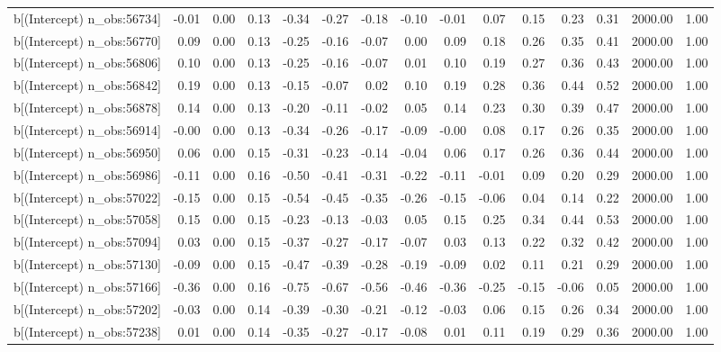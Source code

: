 \begin{table}[ht]
\begin{tabular}{rrrrrrrrrrrrrrr}
  b[(Intercept) n\_obs:56734] & -0.01 & 0.00 & 0.13 & -0.34 & -0.27 & -0.18 & -0.10 & -0.01 & 0.07 & 0.15 & 0.23 & 0.31 & 2000.00 & 1.00 \\ 
  b[(Intercept) n\_obs:56770] & 0.09 & 0.00 & 0.13 & -0.25 & -0.16 & -0.07 & 0.00 & 0.09 & 0.18 & 0.26 & 0.35 & 0.41 & 2000.00 & 1.00 \\ 
  b[(Intercept) n\_obs:56806] & 0.10 & 0.00 & 0.13 & -0.25 & -0.16 & -0.07 & 0.01 & 0.10 & 0.19 & 0.27 & 0.36 & 0.43 & 2000.00 & 1.00 \\ 
  b[(Intercept) n\_obs:56842] & 0.19 & 0.00 & 0.13 & -0.15 & -0.07 & 0.02 & 0.10 & 0.19 & 0.28 & 0.36 & 0.44 & 0.52 & 2000.00 & 1.00 \\ 
  b[(Intercept) n\_obs:56878] & 0.14 & 0.00 & 0.13 & -0.20 & -0.11 & -0.02 & 0.05 & 0.14 & 0.23 & 0.30 & 0.39 & 0.47 & 2000.00 & 1.00 \\ 
  b[(Intercept) n\_obs:56914] & -0.00 & 0.00 & 0.13 & -0.34 & -0.26 & -0.17 & -0.09 & -0.00 & 0.08 & 0.17 & 0.26 & 0.35 & 2000.00 & 1.00 \\ 
  b[(Intercept) n\_obs:56950] & 0.06 & 0.00 & 0.15 & -0.31 & -0.23 & -0.14 & -0.04 & 0.06 & 0.17 & 0.26 & 0.36 & 0.44 & 2000.00 & 1.00 \\ 
  b[(Intercept) n\_obs:56986] & -0.11 & 0.00 & 0.16 & -0.50 & -0.41 & -0.31 & -0.22 & -0.11 & -0.01 & 0.09 & 0.20 & 0.29 & 2000.00 & 1.00 \\ 
  b[(Intercept) n\_obs:57022] & -0.15 & 0.00 & 0.15 & -0.54 & -0.45 & -0.35 & -0.26 & -0.15 & -0.06 & 0.04 & 0.14 & 0.22 & 2000.00 & 1.00 \\ 
  b[(Intercept) n\_obs:57058] & 0.15 & 0.00 & 0.15 & -0.23 & -0.13 & -0.03 & 0.05 & 0.15 & 0.25 & 0.34 & 0.44 & 0.53 & 2000.00 & 1.00 \\ 
  b[(Intercept) n\_obs:57094] & 0.03 & 0.00 & 0.15 & -0.37 & -0.27 & -0.17 & -0.07 & 0.03 & 0.13 & 0.22 & 0.32 & 0.42 & 2000.00 & 1.00 \\ 
  b[(Intercept) n\_obs:57130] & -0.09 & 0.00 & 0.15 & -0.47 & -0.39 & -0.28 & -0.19 & -0.09 & 0.02 & 0.11 & 0.21 & 0.29 & 2000.00 & 1.00 \\ 
  b[(Intercept) n\_obs:57166] & -0.36 & 0.00 & 0.16 & -0.75 & -0.67 & -0.56 & -0.46 & -0.36 & -0.25 & -0.15 & -0.06 & 0.05 & 2000.00 & 1.00 \\ 
  b[(Intercept) n\_obs:57202] & -0.03 & 0.00 & 0.14 & -0.39 & -0.30 & -0.21 & -0.12 & -0.03 & 0.06 & 0.15 & 0.26 & 0.34 & 2000.00 & 1.00 \\ 
  b[(Intercept) n\_obs:57238] & 0.01 & 0.00 & 0.14 & -0.35 & -0.27 & -0.17 & -0.08 & 0.01 & 0.11 & 0.19 & 0.29 & 0.36 & 2000.00 & 1.00 \\ 

\end{tabular}
\end{table}
